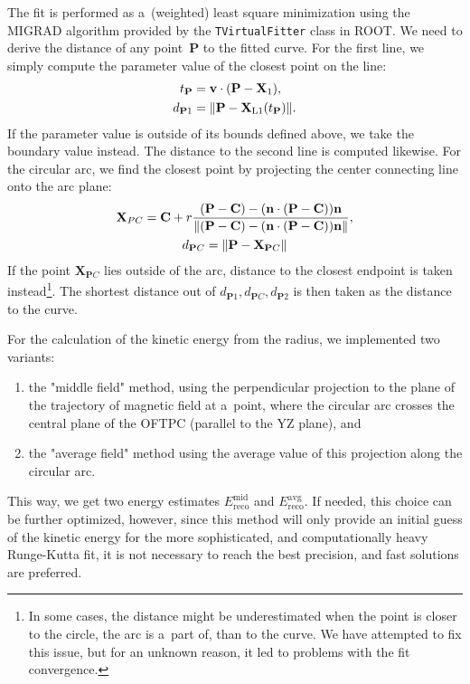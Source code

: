 			The fit is performed as a~(weighted) least square minimization using the MIGRAD algorithm provided by the \texttt{TVirtualFitter} class in ROOT. We need to derive the distance of any point~$\mathbf{P}$ to the fitted curve. For the first line, we simply compute the parameter value of the closest point on the line:
				\begin{equation}
					\label{eq:segdist}
					\begin{aligned}
						t_\mathbf{P} &= \mathbf{v}\cdot(\mathbf{P}-\mathbf{X}_1),\\
						d_{\mathbf{P}1} &= \norm{\mathbf{P}-\mathbf{X}_\text{L1}(t_\mathbf{P})}.
					\end{aligned}
				\end{equation}
			If the parameter value is outside of its bounds defined above, we take the boundary value instead. The distance to the second line is computed likewise. For the circular arc, we find the closest point by projecting the center connecting line onto the arc plane:
				\begin{gather}
					\mathbf{X}_{PC} = \mathbf{C} + r\frac{(\mathbf{P}-\mathbf{C})-(\mathbf{n}\cdot(\mathbf{P}-\mathbf{C}))\mathbf{n}}{\norm{(\mathbf{P}-\mathbf{C})-(\mathbf{n}\cdot(\mathbf{P}-\mathbf{C}))\mathbf{n}}},\\
					d_{\mathbf{P}C} = \norm{\mathbf{P}-\mathbf{X}_{\mathbf{P}C}}
				\end{gather}
			If the point $\mathbf{X}_{\mathbf{P}C}$ lies outside of the arc, distance to the closest endpoint is taken instead\footnote{In some cases, the distance might be underestimated when the point is closer to the circle, the arc is a~part of, than to the curve. We have attempted to fix this issue, but for an unknown reason, it led to problems with the fit convergence.}. The shortest distance out of $d_{\mathbf{P}1},d_{\mathbf{P}C},d_{\mathbf{P}2}$ is then taken as the distance to the curve.
			
			For the calculation of the kinetic energy from the radius, we implemented two variants:
				\begin{enumerate}[nosep]
				 	\item the "middle field" method, using the perpendicular projection to the plane of the trajectory of magnetic field at a~point, where the circular arc crosses the central plane of the \ac{OFTPC} (parallel to the YZ plane), and
				 	\item the "average field" method using the average value of this projection along the circular arc.
				\end{enumerate}
			This way, we get two energy estimates $E_{\text{reco}}^{\text{mid}}$ and $E_{\text{reco}}^{\text{avg}}$. If needed, this choice can be further optimized, however, since this method will only provide an initial guess of the kinetic energy for the more sophisticated, and computationally heavy Runge-Kutta fit, it is not necessary to reach the best precision, and fast solutions are preferred.
			
